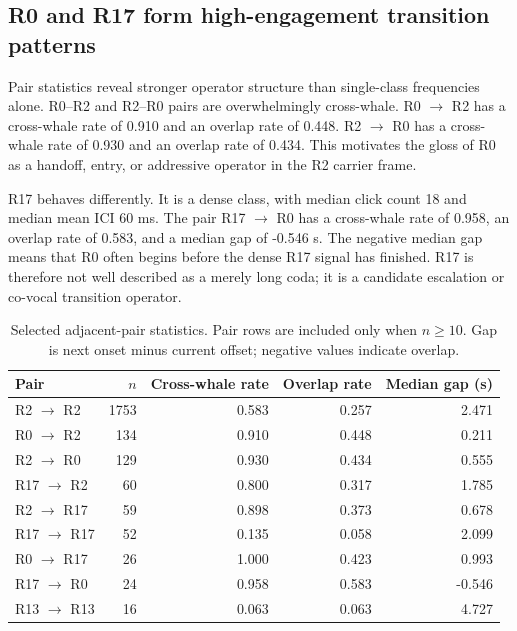 \documentclass[11pt]{article}
\begin{document}
\subsection{R0 and R17 form high-engagement transition patterns}

Pair statistics reveal stronger operator structure than single-class frequencies alone. R0--R2 and R2--R0 pairs are overwhelmingly cross-whale. R0 $\rightarrow$ R2 has a cross-whale rate of 0.910 and an overlap rate of 0.448. R2 $\rightarrow$ R0 has a cross-whale rate of 0.930 and an overlap rate of 0.434. This motivates the gloss of R0 as a handoff, entry, or addressive operator in the R2 carrier frame.

R17 behaves differently. It is a dense class, with median click count 18 and median mean ICI 60 ms. The pair R17 $\rightarrow$ R0 has a cross-whale rate of 0.958, an overlap rate of 0.583, and a median gap of -0.546 s. The negative median gap means that R0 often begins before the dense R17 signal has finished. R17 is therefore not well described as a merely long coda; it is a candidate escalation or co-vocal transition operator.

\begin{table}[H]
\centering
\caption{Selected adjacent-pair statistics. Pair rows are included only when $n \geq 10$. Gap is next onset minus current offset; negative values indicate overlap.}
\label{tab:pair_stats}
\begin{tabular}{lrrrr}
\toprule
Pair & $n$ & Cross-whale rate & Overlap rate & Median gap (s) \\
\midrule
R2 $\rightarrow$ R2 & 1753 & 0.583 & 0.257 & 2.471 \\
R0 $\rightarrow$ R2 & 134 & 0.910 & 0.448 & 0.211 \\
R2 $\rightarrow$ R0 & 129 & 0.930 & 0.434 & 0.555 \\
R17 $\rightarrow$ R2 & 60 & 0.800 & 0.317 & 1.785 \\
R2 $\rightarrow$ R17 & 59 & 0.898 & 0.373 & 0.678 \\
R17 $\rightarrow$ R17 & 52 & 0.135 & 0.058 & 2.099 \\
R0 $\rightarrow$ R17 & 26 & 1.000 & 0.423 & 0.993 \\
R17 $\rightarrow$ R0 & 24 & 0.958 & 0.583 & -0.546 \\
R13 $\rightarrow$ R13 & 16 & 0.063 & 0.063 & 4.727 \\
\bottomrule
\end{tabular}
\end{table}
\end{document}
